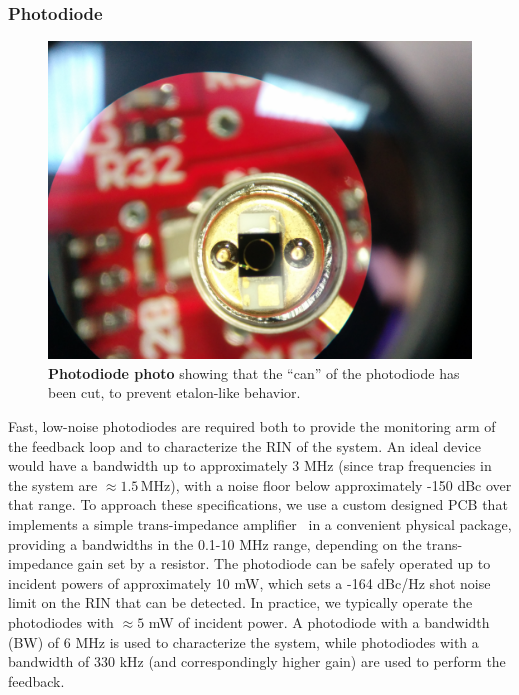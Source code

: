 \documentclass[twocolumn,aps,pra,showpacs,preprintnumbers,bibnotes]{revtex4-1}
\begin{document}
\subsubsection{Photodiode}

\begin{figure}
  \begin{center}
    \includegraphics[width=\columnwidth]{fig/cut_photodiode.jpg}
    \caption{\textbf{Photodiode photo} showing that the ``can'' of the photodiode has been cut, to prevent etalon-like behavior.}\label{fig:cut_pd}
  \end{center}
\end{figure}

Fast, low-noise photodiodes are required both to provide the monitoring arm of the feedback loop and to characterize the RIN of the system.
An ideal device would have a bandwidth up to approximately 3 MHz (since trap frequencies in the system are $\approx1.5\,$MHz), with a noise floor below approximately -150 dBc over that range.
To approach these specifications, we use a custom designed PCB that implements a simple trans-impedance amplifier~\cite{Graeme1995} in a convenient physical package, providing a bandwidths in the 0.1-10 MHz range, depending on the trans-impedance gain set by a resistor. 
The photodiode can be safely operated up to incident powers of approximately 10 mW, which sets a -164 dBc/Hz shot noise limit on the RIN that can be detected. 
In practice, we typically operate the photodiodes with $\approx 5$ mW of incident power.
A photodiode with a bandwidth (BW) of 6 MHz is used to characterize the system, while photodiodes with a bandwidth of 330 kHz (and correspondingly higher gain) are used to perform the feedback.
\end{document}
